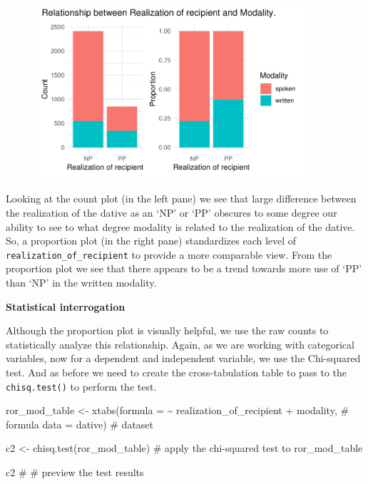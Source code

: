\documentclass[
  letterpaper,
]{latex/krantz}
\newenvironment{Shaded}{\begin{snugshade}}{\end{snugshade}}
\newcommand{\AttributeTok}[1]{\textcolor[rgb]{0.40,0.45,0.13}{#1}}
\newcommand{\CommentTok}[1]{\textcolor[rgb]{0.37,0.37,0.37}{#1}}
\newcommand{\FunctionTok}[1]{\textcolor[rgb]{0.28,0.35,0.67}{#1}}
\newcommand{\NormalTok}[1]{\textcolor[rgb]{0.00,0.23,0.31}{#1}}
\newcommand{\OtherTok}[1]{\textcolor[rgb]{0.00,0.23,0.31}{#1}}
\newcommand{\SpecialCharTok}[1]{\textcolor[rgb]{0.37,0.37,0.37}{#1}}
\begin{document}
\begin{figure}[H]

{\centering \includegraphics[width=0.9\textwidth,height=\textheight]{./inference_files/figure-pdf/i-bi-cat-visual-1.pdf}

}

\end{figure}

Looking at the count plot (in the left pane) we see that large
difference between the realization of the dative as an `NP' or `PP'
obscures to some degree our ability to see to what degree modality is
related to the realization of the dative. So, a proportion plot (in the
right pane) standardizes each level of
\texttt{realization\_of\_recipient} to provide a more comparable view.
From the proportion plot we see that there appears to be a trend towards
more use of `PP' than `NP' in the written modality.

\textbf{Statistical interrogation}

Although the proportion plot is visually helpful, we use the raw counts
to statistically analyze this relationship. Again, as we are working
with categorical variables, now for a dependent and independent
variable, we use the Chi-squared test. And as before we need to create
the cross-tabulation table to pass to the \texttt{chisq.test()} to
perform the test.

\begin{Shaded}
\begin{Highlighting}[]
\NormalTok{ror\_mod\_table }\OtherTok{\textless{}{-}} 
  \FunctionTok{xtabs}\NormalTok{(}\AttributeTok{formula =} \SpecialCharTok{\textasciitilde{}}\NormalTok{ realization\_of\_recipient }\SpecialCharTok{+}\NormalTok{ modality, }\CommentTok{\# formula }
        \AttributeTok{data =}\NormalTok{ dative) }\CommentTok{\# dataset}

\NormalTok{c2 }\OtherTok{\textless{}{-}} \FunctionTok{chisq.test}\NormalTok{(ror\_mod\_table) }\CommentTok{\# apply the chi{-}squared test to \textasciigrave{}ror\_mod\_table\textasciigrave{}}

\NormalTok{c2 }\CommentTok{\# \# preview the test results}
\end{Highlighting}
\end{Shaded}
\end{document}
